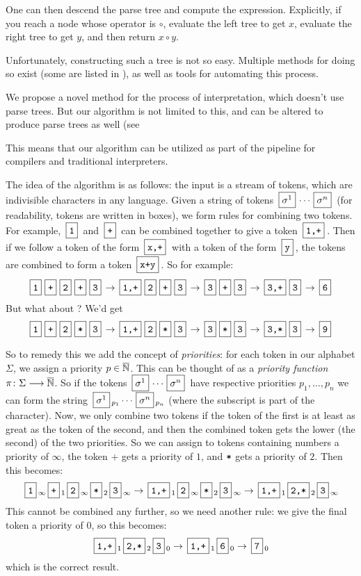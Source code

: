 \documentclass{llncs}
\newcounter{algo}
\begin{document}
One can then descend the parse tree and compute the expression.
Explicitly, if you reach a node whose operator is $\circ$, evaluate the left tree to get $x$, evaluate the right tree to get $y$, and then return $x\circ y$.

Unfortunately, constructing such a tree is not so easy.
Multiple methods for doing so exist (some are listed in \cite{dragon}), as well as tools for automating this process.

We propose a novel method for the process of interpretation, which doesn't use parse trees.
But our algorithm is not limited to this, and can be altered to produce parse trees as well (see 

This means that our algorithm can be utilized as part of the pipeline for compilers and traditional interpreters.

The idea of the algorithm is as follows: the input is a stream of tokens, which are indivisible characters in any language.
Given a string of tokens $\mb{\sigma^1}\cdots\mb{\sigma^n}$ (for readability, tokens are written in boxes), we form rules for combining two tokens.
For example, $\mb{\ttt1}$ and $\mb{\ttt+}$ can be combined together to give a token $\mb{\ttt{1,+}}$.
Then if we follow a token of the form $\mb{\ttt{x,+}}$ with a token of the form $\mb{\ttt y}$, the tokens are combined to form a token $\mb{\ttt{x+y}}$.
So for example:
\[ \mbt{1} \mbt{+} \mbt{2} \mbt{+} \mbt{3} \to \mbt{1,+} \mbt2 \mbt+ \mbt3 \to \mbt{3} \mbt+ \mbt3 \to \mbt{3,+} \mbt3 \to \mbt6 \]
But what about ?
We'd get
\[ \mbt1 \mbt+ \mbt2 \mbt* \mbt3 \to \mbt{1,+} \mbt2 \mbt* \mbt3 \to \mbt3 \mbt* \mbt3 \to \mbt{3,*} \mbt3 \to \mbt9 \]

So to remedy this we add the concept of \textit{priorities}: for each token in our alphabet $\Sigma$, we assign a priority $p\in\overline{\mathbb N}$.
This can be thought of as a \textit{priority function} $\pi\colon\Sigma\longrightarrow\overline{\mathbb N}$.
So if the tokens $\mb{\sigma^1}\cdots\mb{\sigma^n}$ have respective priorities $p_1,\dots,p_n$ we can form the string $\mb{\sigma^1}_{p_1}\cdots\mb{\sigma^n}_{p_n}$ (where the subscript is part of the
character).
Now, we only combine two tokens if the token of the first is at least as great as the token of the second, and then the combined token gets the lower (the second) of the two priorities.
So we can assign to tokens containing numbers a priority of $\infty$, the token \ttt+ gets a priority of $1$, and $\texttt*$ gets a priority of $2$.
Then this becomes:
\[ \mbt1_\infty \mbt+_1 \mbt2_\infty \mbt*_2 \mbt3_\infty \to \mbt{1,+}_1 \mbt2_\infty \mbt*_2 \mbt3_\infty \to \mbt{1,+}_1 \mbt{2,*}_2 \mbt3_\infty \]
This cannot be combined any further, so we need another rule: we give the final token a priority of $0$, so this becomes:
\[ \mbt{1,+}_1 \mbt{2,*}_2 \mbt3_0 \to \mbt{1,+}_1 \mbt{6}_0 \to \mbt{7}_0 \]
which is the correct result.
\end{document}
